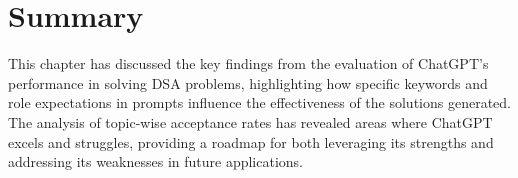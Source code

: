 \section{Summary}
This chapter has discussed the key findings from the evaluation of ChatGPT's performance in solving DSA problems, highlighting how specific keywords and role expectations in prompts influence the effectiveness of the solutions generated. The analysis of topic-wise acceptance rates has revealed areas where ChatGPT excels and struggles, providing a roadmap for both leveraging its strengths and addressing its weaknesses in future applications.
